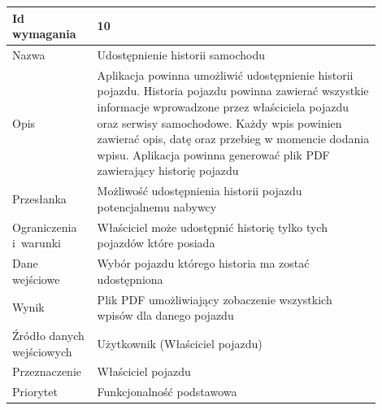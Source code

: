\documentclass[12pt]{article}
\begin{document}
\begin{table}[H]
\begin{center}
	\begin{tabular}{|p{0.18\linewidth}|p{0.72\linewidth}|}%
	\hline
	Id wymagania 	& 10 				\\ \hline
	Nazwa			& Udostępnienie historii samochodu \\ \hline
	Opis &	Aplikacja powinna umożliwić udostępnienie historii pojazdu. Historia pojazdu powinna zawierać wszystkie informacje wprowadzone przez właściciela pojazdu oraz serwisy samochodowe. Każdy wpis powinien zawierać opis, datę oraz przebieg w momencie dodania wpisu. Aplikacja powinna generować plik PDF zawierający historię pojazdu \\ \hline
	Przesłanka & Możliwość udostępnienia historii pojazdu potencjalnemu nabywcy   \\ \hline
	Ograniczenia i~warunki & Właściciel może udostępnić historię tylko tych pojazdów które posiada \\ \hline
	Dane wejściowe &Wybór pojazdu którego historia ma zostać udostępniona \\ \hline
	Wynik & Plik PDF umożliwiający zobaczenie wszystkich wpisów dla danego pojazdu\\ \hline
	Źródło danych wejściowych &Użytkownik (Właściciel pojazdu)\\ \hline
	Przeznaczenie & Właściciel pojazdu\\ \hline
	Priorytet & Funkcjonalność podstawowa \\ \hline
	\end{tabular}
\end{center}
\end{table}
\end{document}
